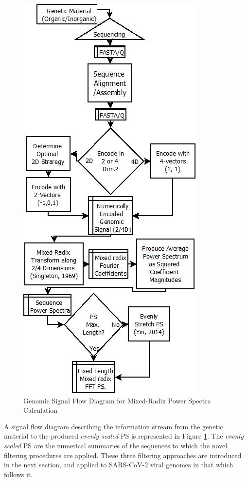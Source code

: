 \documentclass[10pt,conference]{IEEEtran}
\begin{document}
\begin{figure}[h!]
\caption{Genomic Signal Flow Diagram for Mixed-Radix Power Spectra Calculation} 
\label{fig:fftflow} 
\begin{center} 
\includegraphics[scale=0.6]{Images/Files/GenomicFFTSignalFlow.png}
\end{center} 
\end{figure} 

A signal flow diagram describing the information stream from the genetic material to the produced \textit{evenly scaled} PS is represented in Figure \ref{fig:fftflow}.  
The \textit{evenly scaled} PS are the numerical summaries of the sequences to which 
the novel filtering procedures are applied.
These three filtering approaches are introduced in the next section, and applied to SARS-CoV-2 viral genomes in that which follows it. 
\end{document}
